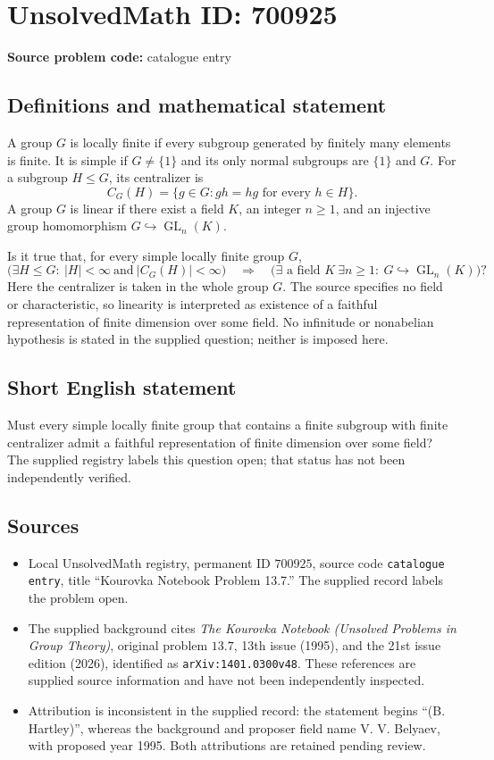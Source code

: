 \documentclass[11pt]{article}
\begin{document}
\section*{UnsolvedMath ID: 700925}
\textbf{Source problem code:} catalogue entry
\subsection{Definitions and mathematical statement}
A group \(G\) is locally finite if every subgroup generated by finitely many elements is finite. It is simple if \(G\ne\{1\}\) and its only normal subgroups are \(\{1\}\) and \(G\). For a subgroup \(H\le G\), its centralizer is
\[
C_G(H)=\{g\in G: gh=hg\text{ for every }h\in H\}.
\]
A group \(G\) is linear if there exist a field \(K\), an integer \(n\ge1\), and an injective group homomorphism \(G\hookrightarrow\operatorname{GL}_n(K)\).

Is it true that, for every simple locally finite group \(G\),
\[
\bigl(\exists H\le G:\ |H|<\infty\ \text{and}\ |C_G(H)|<\infty\bigr)
\quad\Longrightarrow\quad
\bigl(\exists\text{ a field }K\ \exists n\ge1:\ G\hookrightarrow\operatorname{GL}_n(K)\bigr)?
\]
Here the centralizer is taken in the whole group \(G\). The source specifies no field or characteristic, so linearity is interpreted as existence of a faithful representation of finite dimension over some field. No infinitude or nonabelian hypothesis is stated in the supplied question; neither is imposed here.
\subsection{Short English statement}
Must every simple locally finite group that contains a finite subgroup with finite centralizer admit a faithful representation of finite dimension over some field? The supplied registry labels this question open; that status has not been independently verified.
\subsection{Sources}
\begin{itemize}
\item Local UnsolvedMath registry, permanent ID \(700925\), source code \texttt{catalogue entry}, title ``Kourovka Notebook Problem 13.7.'' The supplied record labels the problem open.
\item The supplied background cites \emph{The Kourovka Notebook (Unsolved Problems in Group Theory)}, original problem \(13.7\), 13th issue (1995), and the 21st issue edition (2026), identified as \texttt{arXiv:1401.0300v48}. These references are supplied source information and have not been independently inspected.
\item Attribution is inconsistent in the supplied record: the statement begins ``(B. Hartley)'', whereas the background and proposer field name V. V. Belyaev, with proposed year 1995. Both attributions are retained pending review.
\end{itemize}
\end{document}
